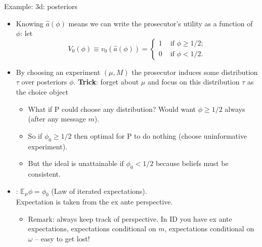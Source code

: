 \documentclass[english,10pt
,aspectratio=169
]{beamer}
\begin{document}
\begin{frame}{Example: 3d: posteriors}
\begin{itemize}
	\item Knowing $\hat{a}(\phi)$ means we can write the prosecutor's utility as a function of $\phi$: let
	\vspace{-0.5em}
	\begin{equation*}
		V_0 (\phi) \equiv v_0(\hat{a}(\phi)) = \begin{cases}
			1 & \text{ if } \phi \geq 1/2;
			\\
			0 & \text{ if } \phi < 1/2.
		\end{cases}
	\end{equation*}
	\vspace{-1.5em}
	\pause
	\item By choosing an experiment $(\mu,M)$ the prosecutor induces some distribution $\tau$ over posteriors $\phi$. \textbf{Trick}: forget about $\mu$ and focus on this distribution $\tau$ as the choice object
	\begin{itemize}
		\item What if P could choose any distribution? Would want $\phi \geq 1/2$ always (after any message $m$).
		\item So if $\phi_0 \geq 1/2$ then optimal for P to do nothing (choose uninformative experiment).
		\item But the ideal is unattainable if $\phi_0 < 1/2$ because beliefs must be \alert{consistent}.
	\end{itemize}
	\pause
	\item {}: $\mathbb{E}_\mu \phi = \phi_0$ (Law of iterated expectations). \\
	Expectation is taken from the ex ante perspective.
	\begin{itemize}
		\item \alert{Remark}: always keep track of perspective. In ID you have ex ante expectations, expectations conditional on $m$, expectations conditional on $\omega$ -- easy to get lost!
	\end{itemize}
\end{itemize}
\end{frame}
\end{document}
